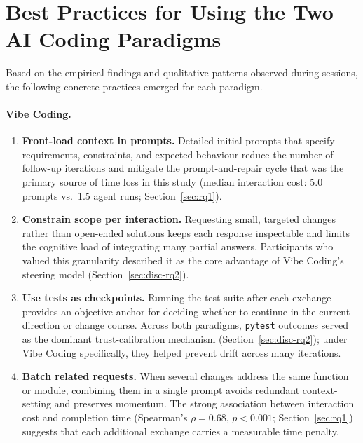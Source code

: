 \pagebreak


\section{Best Practices for Using the Two AI Coding Paradigms}

Based on the empirical findings and qualitative patterns observed during sessions, the following concrete practices emerged for each paradigm.

\paragraph{Vibe Coding.}

\begin{enumerate}

  \item \textbf{Front-load context in prompts.} Detailed initial prompts that specify requirements, constraints, and expected behaviour reduce the number of follow-up iterations and mitigate the prompt-and-repair cycle that was the primary source of time loss in this study (median interaction cost: 5.0 prompts vs.\ 1.5 agent runs; Section~\ref{sec:rq1}).

  \item \textbf{Constrain scope per interaction.} Requesting small, targeted changes rather than open-ended solutions keeps each response inspectable and limits the cognitive load of integrating many partial answers. Participants who valued this granularity described it as the core advantage of Vibe Coding's steering model (Section~\ref{sec:disc-rq2}).

  \item \textbf{Use tests as checkpoints.} Running the test suite after each exchange provides an objective anchor for deciding whether to continue in the current direction or change course. Across both paradigms, \texttt{pytest} outcomes served as the dominant trust-calibration mechanism (Section~\ref{sec:disc-rq2}); under Vibe Coding specifically, they helped prevent drift across many iterations.

  \item \textbf{Batch related requests.} When several changes address the same function or module, combining them in a single prompt avoids redundant context-setting and preserves momentum. The strong association between interaction cost and completion time (Spearman's $\rho=0.68$, $p<0.001$; Section~\ref{sec:rq1}) suggests that each additional exchange carries a measurable time penalty.

\end{enumerate}

